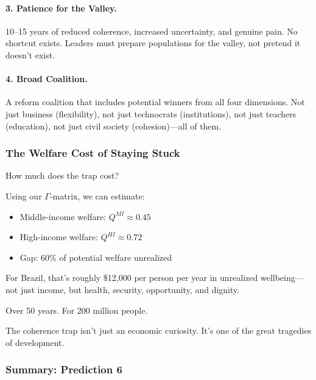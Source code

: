 \paragraph{3. Patience for the Valley.}
10--15 years of reduced coherence, increased uncertainty, and genuine pain. 
No shortcut exists. Leaders must prepare populations for the valley, 
not pretend it doesn't exist.

\paragraph{4. Broad Coalition.}
A reform coalition that includes potential winners from all four dimensions. 
Not just business (flexibility), not just technocrats (institutions), 
not just teachers (education), not just civil society (cohesion)---all of them.

\subsubsection{The Welfare Cost of Staying Stuck}

How much does the trap cost?

Using our $\Gamma$-matrix, we can estimate:
\begin{itemize}
    \item Middle-income welfare: $Q^{MI} \approx 0.45$
    \item High-income welfare: $Q^{HI} \approx 0.72$
    \item Gap: 60\% of potential welfare unrealized
\end{itemize}

For Brazil, that's roughly \$12,000 per person per year in unrealized 
wellbeing---not just income, but health, security, opportunity, and 
dignity.

Over 50 years. For 200 million people.

The coherence trap isn't just an economic curiosity. It's one of the 
great tragedies of development.

\subsubsection{Summary: Prediction 6}

